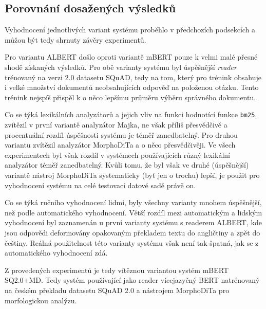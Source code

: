 \subsection{Porovnání dosažených výsledků}
Vyhodnocení jednotlivých variant systému proběhlo v předchozích podsekcích a můžou být tedy shrnuty závěry experimentů. \par
Pro variantu ALBERT došlo oproti variantě mBERT pouze k velmi malé přesné shodě získaných výsledků. Pro obě varianty systému byl úspěšnější \emph{reader} trénovaný na verzi 2.0 datasetu SQuAD, tedy na tom, který pro trénink obsahuje i velké množství dokumentů neobsahujících odpověď na položenou otázku. Tento trénink nejspíš přispěl k o něco lepšímu průměru výběru správného dokumentu.\par
Co se týká lexikálních analyzátorů a jejich vliv na funkci hodnotící funkce \texttt{bm25}, zvítězil v první variantě analyzátor Majka, ne však příliš přesvědčivě a procentuální rozdíl úspěšnosti systému je téměř zanedbatelný. Pro druhou variantu zvítězil analyzátor MorphoDiTa a o něco přesvědčivěji. Ve všech experimentech byl však rozdíl v systémech používajících různý lexikální analyzátor téměř zanedbatelný. Kvůli tomu, že byl však ve druhé (úspěšnější) variantě nástroj MorphoDiTa systematicky (byť jen o trochu) lepší, je použit pro vyhodnocení systému na celé testovací datové sadě právě on.\par
Co se týká ručního vyhodnocení lidmi, byly všechny varianty mnohem úspěšnější, než podle automatického vyhodnocení. Větší rozdíl mezi automatickým a lidským vyhodnocení byl zaznamenán u první varianty systému s readerem ALBERT, kde jsou odpovědi deformovány opakovaným překladem textu do angličtiny a zpět do češtiny. Reálná použitelnost této varianty systému však není tak špatná, jak se z automatického vyhodnocení zdá.\par
Z provedených experimentů je tedy vítěznou variantou systém mBERT SQ2.0+MD. Tedy systém používající jako reader vícejazyčný BERT natrénovaný na českém překladu datasetu SQuAD 2.0 a nástrojem MorphoDiTa pro morfologickou analýzu.

